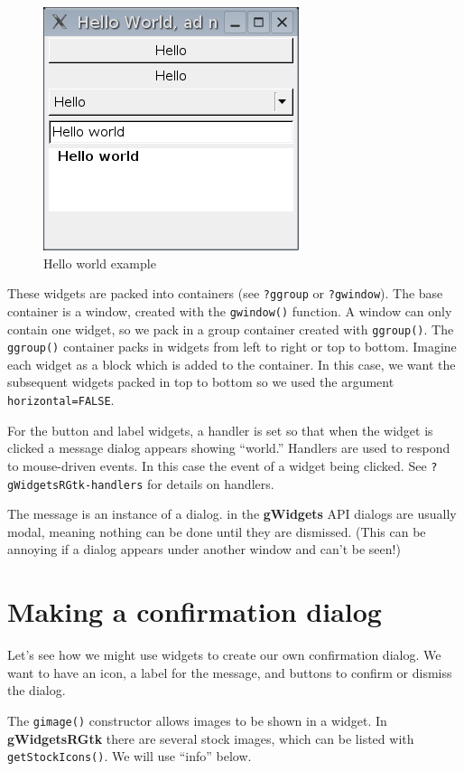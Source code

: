 \documentclass[12pt]{article}
\newcommand{\RCode}[1]{\texttt{#1}}
\newcommand{\RFunc}[1]{\texttt{#1()}}
\newcommand{\RPackage}[1]{\textbf{#1}}
\begin{document}
\begin{figure}[htbp]
  \centering
  \includegraphics[width=.35\textwidth]{helloWorld}
  \caption{Hello world example}
  \label{fig:hello-world}
\end{figure}

These widgets are packed into containers (see \RCode{?ggroup} or
\RCode{?gwindow}). The base container is a window, created with the
\RFunc{gwindow} function. A window can only contain one widget, so
we pack in a group container created with \RFunc{ggroup}. The
\RFunc{ggroup} container packs in widgets from left to right or top to
bottom. Imagine each widget as a block which is added to the
container.  In this case, we want the subsequent widgets packed in top
to bottom so we used the argument \RCode{horizontal=FALSE}.

For the button and label widgets, a  handler is set so that when the widget is
clicked a message dialog appears showing ``world.'' Handlers are used
to respond to mouse-driven events. In this case the event of a widget
being clicked. See \RCode{?gWidgetsRGtk-handlers} for details on
handlers. 

The message is an instance of a dialog. in the \RPackage{gWidgets} API
dialogs are usually modal, meaning nothing can be done until they are
dismissed. (This can be annoying if a dialog appears under another
window and can't be seen!)


\section{Making a confirmation dialog}

Let's see how we might use widgets to create our own confirmation
dialog. We want to have an icon, a label for the message, and  buttons
to confirm or dismiss the dialog.

The \RFunc{gimage} constructor allows images to be shown in a
widget. In \RPackage{gWidgetsRGtk} there are several stock images, which can be
listed with \RFunc{getStockIcons}. We will use ``info'' below.
\end{document}
